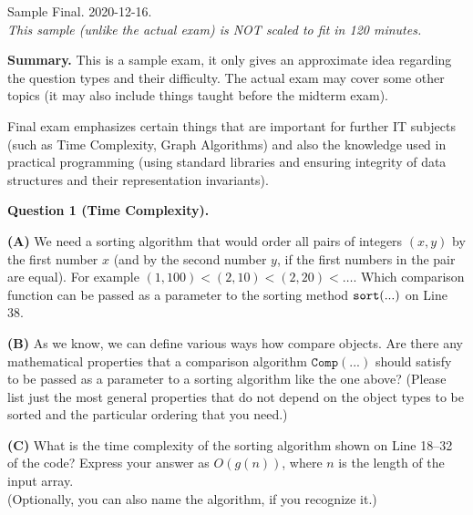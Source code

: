 \documentclass[a4paper,12pt]{article}
\begin{document}
\thispagestyle{empty}

\twocolumn

\begin{center}
{\Large Sample Final. 2020-12-16.}\\
{\em This sample (unlike the actual exam) 
is NOT scaled to fit in 120 minutes.} 
\end{center}

{\footnotesize 
{\bf Summary.} This is a sample exam, it only gives an 
approximate idea regarding the question types and their difficulty. 
The actual exam may cover some other topics (it may also include 
things taught before the midterm exam). 

Final exam emphasizes certain things that are important for further
IT subjects (such as Time Complexity, Graph Algorithms) and also 
the knowledge used in practical programming 
(using standard libraries and ensuring integrity of data structures
and their representation invariants).
}


% 
\vspace{10pt}
{\bf Question 1 (Time Complexity).} 


\vspace{5pt}
{\bf (A)} We need a sorting algorithm that would order all pairs of integers $(x,y)$ 
by the first number $x$ (and by the second number $y$, if the first 
numbers in the pair are equal). For example $(1,100) < (2,10) < (2,20) < \ldots$. 
Which comparison function can be passed as a parameter to 
the sorting method ${\tt sort(...)}$ on Line 38.

\vspace{5pt}
{\bf (B)} As we know, we can define various ways how compare 
objects.
Are there any mathematical properties that a comparison algorithm $\mathtt{Comp(...)}$ 
should satisfy to be passed as a parameter to a sorting algorithm like the one above? 
(Please list just the most general properties that 
do not depend on the object types to be sorted and the
particular ordering that you need.)

 
\vspace{5pt}
{\bf (C)} What is the time complexity of the sorting algorithm 
shown on Line 18--32 of the code? Express your answer as $O(g(n))$,
where $n$ is the length of the input array.\\
(Optionally, you can also name the algorithm, if you recognize it.)
\end{document}
